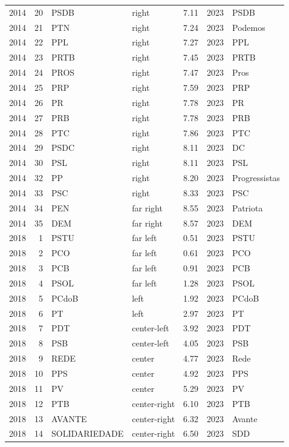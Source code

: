 \documentclass[11pt]{article}
\begin{document}
\begin{longtable}{rrlllrl}
2014 & 20 & PSDB & right & 7.11 & 2023 & PSDB \\
2014 & 21 & PTN & right & 7.24 & 2023 & Podemos \\
2014 & 22 & PPL & right & 7.27 & 2023 & PPL \\
2014 & 23 & PRTB & right & 7.45 & 2023 & PRTB \\
2014 & 24 & PROS & right & 7.47 & 2023 & Pros \\
2014 & 25 & PRP & right & 7.59 & 2023 & PRP \\
2014 & 26 & PR & right & 7.78 & 2023 & PR \\
2014 & 27 & PRB & right & 7.78 & 2023 & PRB \\
2014 & 28 & PTC & right & 7.86 & 2023 & PTC \\
2014 & 29 & PSDC & right & 8.11 & 2023 & DC \\
2014 & 30 & PSL & right & 8.11 & 2023 & PSL \\
2014 & 32 & PP & right & 8.20 & 2023 & Progressistas \\
2014 & 33 & PSC & right & 8.33 & 2023 & PSC \\
2014 & 34 & PEN & far right & 8.55 & 2023 & Patriota \\
2014 & 35 & DEM & far right & 8.57 & 2023 & DEM \\
2018 & 1 & PSTU & far left & 0.51 & 2023 & PSTU \\
2018 & 2 & PCO & far left & 0.61 & 2023 & PCO \\
2018 & 3 & PCB & far left & 0.91 & 2023 & PCB \\
2018 & 4 & PSOL & far left & 1.28 & 2023 & PSOL \\
2018 & 5 & PCdoB & left & 1.92 & 2023 & PCdoB \\
2018 & 6 & PT & left & 2.97 & 2023 & PT \\
2018 & 7 & PDT & center-left & 3.92 & 2023 & PDT \\
2018 & 8 & PSB & center-left & 4.05 & 2023 & PSB \\
2018 & 9 & REDE & center & 4.77 & 2023 & Rede \\
2018 & 10 & PPS & center & 4.92 & 2023 & PPS \\
2018 & 11 & PV & center & 5.29 & 2023 & PV \\
2018 & 12 & PTB & center-right & 6.10 & 2023 & PTB \\
2018 & 13 & AVANTE & center-right & 6.32 & 2023 & Avante \\
2018 & 14 & SOLIDARIEDADE & center-right & 6.50 & 2023 & SDD \\

\end{longtable}
\end{document}
